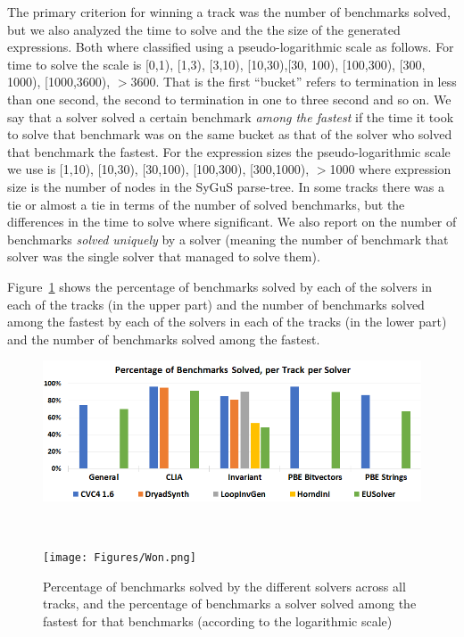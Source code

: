 The primary criterion for winning a track was the number of benchmarks solved, but we also analyzed the time to solve and the the size of the generated expressions. Both where classified using a pseudo-logarithmic scale as follows.
For time to solve the scale is [0,1), [1,3), [3,10), [10,30),[30, 100), [100,300), [300, 1000), [1000,3600), $>$3600. That is the first ``bucket'' refers to termination in less than one second, the second to termination in one to three second and so on. We say that a solver solved a certain benchmark \emph{among the fastest} if the time it took to solve that benchmark was on the same bucket as that of the solver who solved that benchmark the fastest. 
For the expression sizes the pseudo-logarithmic scale we use is [1,10), [10,30), [30,100), [100,300), [300,1000), $>$1000 where expression size is the number of nodes in the SyGuS parse-tree.
In some tracks there was a tie or almost a tie in terms of the number of solved benchmarks, but the differences in the time to solve where significant.
We also report on the number of benchmarks \emph{solved uniquely} by a solver (meaning the number of benchmark that solver was the single solver that managed to solve them).



Figure~\ref{fig:resultsPerTrack} shows the percentage of benchmarks solved by each of the solvers in each of the tracks (in the upper part) and the number of benchmarks solved among the fastest by each of the solvers in each of the tracks (in the lower part) and the number of benchmarks solved among the fastest. 

\begin{figure}
	\begin{center}
		\begin{minipage}{1\textwidth}
			\centering
			\includegraphics[scale=0.9,width=1\textwidth]{Figures/Solved.png}
		\end{minipage}
		\\
		\vspace{2mm}
		\begin{minipage}{1\textwidth}
			\centering
			\texttt{[image: Figures/Won.png]}
		\end{minipage}
	\end{center}
	\caption{Percentage of benchmarks solved by the different solvers across all tracks, and the percentage of benchmarks a solver solved among the fastest for that benchmarks (according to the logarithmic scale)}\label{fig:resultsPerTrack}	
\end{figure}


